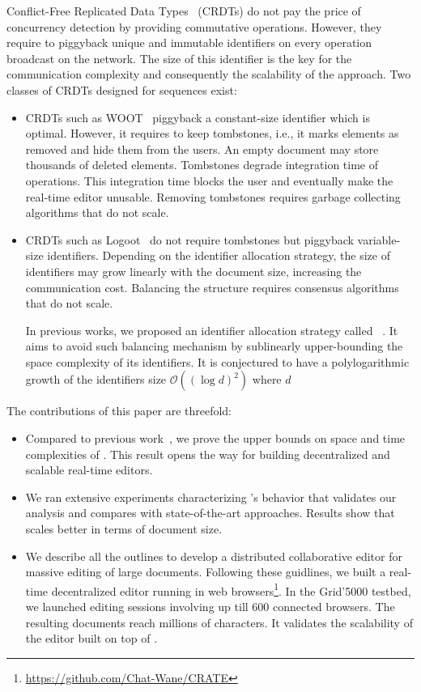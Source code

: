 Conflict-Free Replicated Data Types~\cite{shapiro2011comprehensive} (CRDTs) do
not pay the price of concurrency detection by providing commutative
operations. However, they require to piggyback unique and immutable identifiers
on every operation broadcast on the network. The size of this identifier is the
key for the communication complexity and consequently the scalability of the
approach. Two classes of CRDTs designed for sequences exist:
\begin{itemize}
\item CRDTs such as WOOT~\cite{oster2006data} piggyback a constant-size
  identifier which is optimal. However, it requires to keep tombstones, i.e., it
  marks elements as removed and hide them from the users. An empty document may
  store thousands of deleted elements. Tombstones degrade integration time of
  operations. This integration time blocks the user and eventually make the
  real-time editor unusable. Removing tombstones requires garbage
  collecting algorithms that do not scale.
\item CRDTs such as Logoot~\cite{weiss2010logootundo} do not require tombstones
  but piggyback variable-size identifiers. Depending on the identifier
  allocation strategy, the size of identifiers may grow linearly with the
  document size, increasing the communication cost. Balancing the structure
  requires consensus algorithms that do not scale.

  In previous works, we proposed an identifier allocation strategy called
  \LSEQ~\cite{nedelec2013concurrency, nedelec2013lseq}. It aims to avoid such
  balancing mechanism by sublinearly upper-bounding the space complexity of its
  identifiers. It is conjectured to have a polylogarithmic growth of the
  identifiers size $\mathcal{O}((\log d)^2)$ where $d$ 
\end{itemize}

\noindent The contributions of this paper are threefold:
\begin{itemize}
\item Compared to previous work~\cite{nedelec2013concurrency, nedelec2013lseq},
  we prove the upper bounds on space and time complexities of \LSEQ. This result
  opens the way for building decentralized and scalable real-time editors.
\item We ran extensive experiments characterizing \LSEQ's behavior that
  validates our analysis and compares with state-of-the-art approaches. Results
  show that \LSEQ scales better in terms of document size.
\item We describe all the outlines to develop a distributed collaborative editor
  for massive editing of large documents. Following these guidlines, we built a
  real-time decentralized editor running in web
  browsers\footnote{\url{https://github.com/Chat-Wane/CRATE}}. In the Grid'5000
  testbed, we launched editing sessions involving up till 600 connected
  browsers. The resulting documents reach millions of characters. It validates
  the scalability of the editor built on top of \LSEQ.
\end{itemize}

